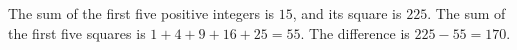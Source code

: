 The sum of the first five positive integers is $15$, and its square is $225$. The sum of the first five squares is $1+4+9+16+25=55$. The difference is $225-55=\boxed{170}$.
